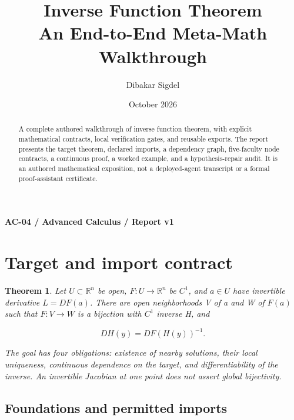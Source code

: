 \documentclass[preprint,12pt,aps,pra,showkeys,amsmath,amssymb,superscriptaddress,floatfix]{revtex4-2}
\newtheorem{theorem}{Theorem}[section]
\theoremstyle{definition}
\theoremstyle{remark}
\begin{document}
\title{Inverse Function Theorem\\[4pt]\large An End-to-End Meta-Math Walkthrough}

\author{Dibakar Sigdel}


\date{October 2026}

\begin{abstract}

A complete authored walkthrough of inverse function theorem, with
explicit mathematical contracts, local verification gates, and reusable
exports. The report presents the target theorem, declared imports, a
dependency graph, five-faculty node contracts, a continuous proof, a
worked example, and a hypothesis-repair audit. It is an authored
mathematical exposition, not a deployed-agent transcript or a formal
proof-assistant certificate.

\end{abstract}\maketitle\linespread{1.12}\selectfont

\noindent\textbf{AC-04 / Advanced Calculus / Report v1}

\section{Target and import contract}

\begin{theorem}

Let \(U\subset\mathbb R^n\) be open, \(F:U\to\mathbb R^n\) be \(C^1\),
and \(a\in U\) have invertible derivative \(L=DF(a)\). There are open
neighborhoods V of a and W of \(F(a)\) such that \(F:V\to W\) is a
bijection with \(C^{1}\) inverse H, and

\[DH(y)=DF(H(y))^{-1}.\]

The goal has four obligations: existence of nearby solutions, their
local uniqueness, continuous dependence on the target, and
differentiability of the inverse. An invertible Jacobian at one point
does not assert global bijectivity.

\end{theorem}

\subsection{Foundations and permitted imports}
\end{document}
